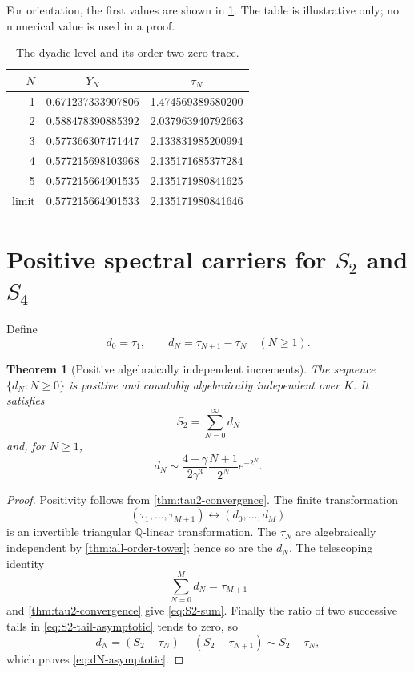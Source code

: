 \documentclass[11pt]{article}
\newtheorem{theorem}{Theorem}[section]
\theoremstyle{definition}
\theoremstyle{remark}
\newcommand{\Q}{\mathbb Q}
\begin{document}
For orientation, the first values are shown in \cref{tab:dyadic-values}.
The table is illustrative only; no numerical value is used in a proof.

\begin{table}[ht]
\centering
\caption{The dyadic level and its order-two zero trace.}
\label{tab:dyadic-values}
\begin{tabular}{@{}rcc@{}}
\toprule
\(N\)&\(Y_N\)&\(\tau_N\)\\
\midrule
1&0.671237333907806&1.474569389580200\\
2&0.588478390885392&2.037963940792663\\
3&0.577366307471447&2.133831985200994\\
4&0.577215698103968&2.135171685377284\\
5&0.577215664901535&2.135171980841625\\
\midrule
limit&0.577215664901533&2.135171980841646\\
\bottomrule
\end{tabular}
\end{table}

\section{Positive spectral carriers for
\texorpdfstring{\(S_2\) and \(S_4\)}{S2 and S4}}
\label{sec:spectral}

Define
\begin{equation}\label{eq:dN-def}
 d_0=\tau_1,
 \qquad
 d_N=\tau_{N+1}-\tau_N\quad(N\ge1).
\end{equation}

\begin{theorem}[Positive algebraically independent increments]
\label{thm:increments}
The sequence \(\{d_N:N\ge0\}\) is positive and countably algebraically
independent over \(K\).  It satisfies
\begin{equation}\label{eq:S2-sum}
 \boxed{\displaystyle S_2=\sum_{N=0}^\infty d_N}
\end{equation}
and, for \(N\ge1\),
\begin{equation}\label{eq:dN-asymptotic}
 d_N\sim
 \frac{4-\gamma}{2\gamma^3}
 \frac{N+1}{2^N}e^{-2^N}.
\end{equation}
\end{theorem}

\begin{proof}
Positivity follows from \cref{thm:tau2-convergence}.  The finite
transformation
\[
 (\tau_1,\ldots,\tau_{M+1})
 \longleftrightarrow(d_0,\ldots,d_M)
\]
is an invertible triangular \(\Q\)-linear transformation.  The
\(\tau_N\) are algebraically independent by
\cref{thm:all-order-tower}; hence so are the \(d_N\).  The telescoping
identity
\[
 \sum_{N=0}^Md_N=\tau_{M+1}
\]
and \cref{thm:tau2-convergence} give \eqref{eq:S2-sum}.  Finally the ratio
of two successive tails in \eqref{eq:S2-tail-asymptotic} tends to zero, so
\[
 d_N=(S_2-\tau_N)-(S_2-\tau_{N+1})\sim S_2-\tau_N,
\]
which proves \eqref{eq:dN-asymptotic}.
\end{proof}
\end{document}
